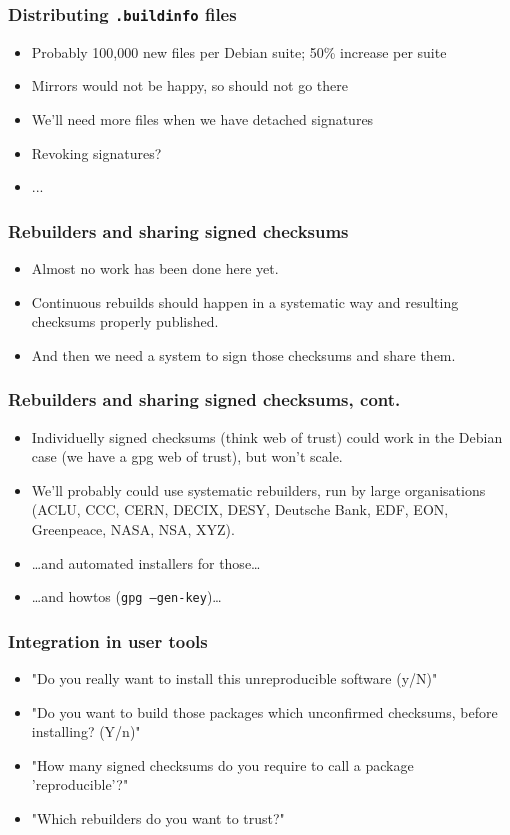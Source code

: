 \documentclass[14pt]{beamer}
\begin{document}
\begin{frame}
 \frametitle{Distributing \texttt{.buildinfo} files}
 \begin{itemize}
  \item Probably 100,000 new files per Debian suite; 50\% increase per suite
  \item Mirrors would not be happy, so should not go there
  \item We'll need more files when we have detached signatures
  \item<2>{Revoking signatures?}
  \item<2>{...}
 \end{itemize}
\end{frame}

\begin{frame}
 \frametitle{Rebuilders and sharing signed checksums}
 \begin{itemize}
  \item Almost no work has been done here yet.
  \item<2-3> Continuous rebuilds should happen in a systematic way and resulting
  checksums properly published.
  \item<3> And then we need a system to sign those checksums and share them. 
 \end{itemize}
\end{frame}

\begin{frame}
 \frametitle{Rebuilders and sharing signed checksums, cont.}
 \begin{itemize}
  \item Individuelly signed checksums (think web of trust) could work in the
  Debian case (we have a gpg web of trust), but won't scale.
  \item<2-4> { We'll probably could use systematic rebuilders, run by large organisations
  (ACLU, CCC, CERN, DECIX, DESY, Deutsche Bank, EDF, EON, Greenpeace, NASA, NSA, XYZ).}
  \item<3-4> { …and automated installers for those… }
  \item<4> { …and howtos (\texttt {gpg --gen-key})…}
 \end{itemize}
\end{frame}


\begin{frame}
 \frametitle{Integration in user tools}
 \begin{itemize}
  \item "Do you really want to install this unreproducible software (y/N)"
  \item<2-4> "Do you want to build those packages which unconfirmed checksums,
  before installing? (Y/n)"
  \item<3-4>{ "How many signed checksums do you require to call a package
  'reproducible'?"}
  \item<4>{ "Which rebuilders do you want to trust?"}
 \end{itemize}
\end{frame}
\end{document}

